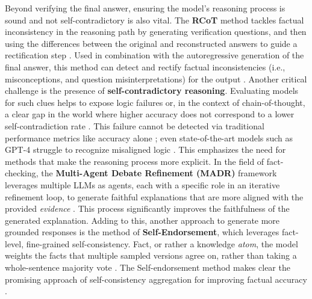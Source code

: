 \documentclass[11pt]{article}
\begin{document}
Beyond verifying the final answer, ensuring the model's reasoning process is sound and not self-contradictory is also vital. The \textbf{RCoT} method tackles factual inconsistency in the reasoning path by generating verification questions, and then using the differences between the original and reconstructed answers to guide a rectification step \cite{ref188}. Used in combination with the autoregressive generation of the final answer, this method can detect and rectify factual inconsistencies (i.e., misconceptions, and question misinterpretations) for the output \cite{ref188}. Another critical challenge is the presence of \textbf{self-contradictory reasoning}. Evaluating models for such clues helps to expose logic failures or, in the context of chain-of-thought, a clear gap in the world where higher accuracy does not correspond to a lower self-contradiction rate \cite{ref189}. This failure cannot be detected via traditional performance metrics like accuracy alone \cite{ref189}; even state-of-the-art models such as GPT-4 struggle to recognize misaligned logic \cite{ref189}. This emphasizes the need for methods that make the reasoning process more explicit. In the field of fact-checking, the \textbf{Multi-Agent Debate Refinement (MADR)} framework leverages multiple LLMs as agents, each with a specific role in an iterative refinement loop, to generate faithful explanations that are more aligned with the provided \emph{evidence} \cite{ref190}. This process significantly improves the faithfulness of the generated explanation. Adding to this, another approach to generate more grounded responses is the method of \textbf{Self-Endorsement}, which leverages fact-level, fine-grained self-consistency. Fact, or rather a knowledge \emph{atom}, the model weights the facts that multiple sampled versions agree on, rather than taking a whole-sentence majority vote \cite{ref191}. The Self-endorsement method makes clear the promising approach of self-consistency aggregation for improving factual accuracy \cite{ref191}.
\end{document}

